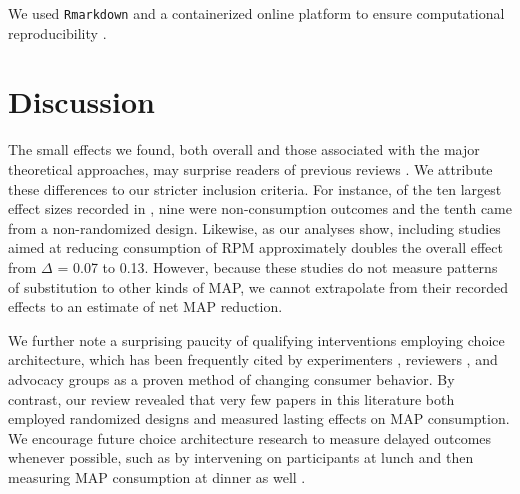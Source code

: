 \documentclass[sn-nature,referee,pdflatex]{sn-jnl}
\begin{document}
We used \texttt{Rmarkdown} \citep{xie2018} and a containerized
\citep{moreau2023} online platform \citep{clyburne2019} to ensure
computational reproducibility \citep{polanin2020}.

\section{Discussion}\label{discussion}

\begin{comment}
intro sentence about prior results?
\end{comment}

The small effects we found, both overall and those associated with the
major theoretical approaches, may surprise readers of previous reviews
\citep{mathur2021meta, meier2022, mertens2022}. We attribute these
differences to our stricter inclusion criteria. For instance, of the ten
largest effect sizes recorded in \citep{mathur2021effectiveness}, nine
were non-consumption outcomes and the tenth came from a non-randomized
design. Likewise, as our analyses show, including studies aimed at
reducing consumption of RPM approximately doubles the overall effect
from \(\Delta\) = 0.07 to 0.13. However, because these studies do not
measure patterns of substitution to other kinds of MAP, we cannot
extrapolate from their recorded effects to an estimate of net MAP
reduction.

We further note a surprising paucity of qualifying interventions
employing choice architecture, which has been frequently cited by
experimenters \citep{boronowsky2022}, reviewers \citep{meier2022}, and
advocacy groups \citep{zhang2022} as a proven method of changing
consumer behavior. By contrast, our review revealed that very few papers
in this literature both employed randomized designs and measured lasting
effects on MAP consumption. We encourage future choice architecture
research to measure delayed outcomes whenever possible, such as by
intervening on participants at lunch and then measuring MAP consumption
at dinner as well \citep{vocski2024}.

\begin{comment}
say something about the ambiguity of whether our results are *null* or just badly underpowered -- maybe these experiments are detecting true effects of about 1-5\%$ reductions but just don't have large enough samples to persuasively show it?
\end{comment}
\end{document}
